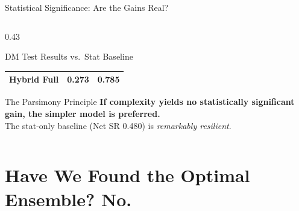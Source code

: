 \documentclass[aspectratio=169,10pt]{beamer}
\begin{document}
\begin{frame}{Statistical Significance: Are the Gains Real?}
\begin{columns}[T]
\begin{column}{0.43\textwidth}
\begin{block}{DM Test Results vs.\ Stat Baseline}
\begin{tabular}{lcc}
          Hybrid Full & 0.273 & 0.785 \\
          \bottomrule
        \end{tabular}
      \end{block}
      \vspace{6pt}
      \begin{alertblock}{The Parsimony Principle}
        \scriptsize
        \textbf{If complexity yields no statistically significant gain, the simpler model is preferred.}\\[3pt]
        The stat-only baseline (Net SR 0.480) is \emph{remarkably resilient}.
      \end{alertblock}
    \end{column}
  \end{columns}
\end{frame}

\section{Have We Found the Optimal Ensemble? No.}
\end{document}
